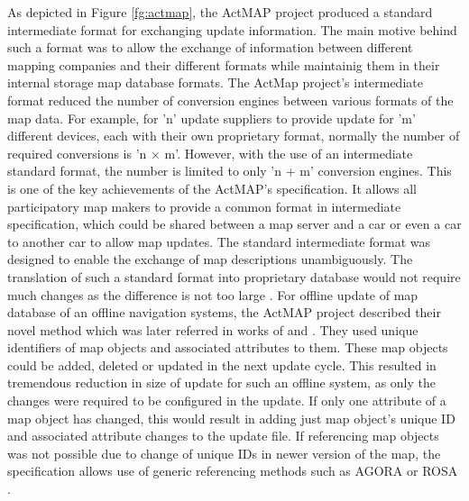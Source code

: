 As depicted in Figure \ref{fg:actmap}, the ActMAP project produced a standard intermediate format for exchanging update information. The main motive behind such a format was to allow the exchange of information between different mapping companies and their different formats while maintainig them in their internal storage map database formats. The ActMap project's intermediate format reduced the number of conversion engines between various formats of the map data. For example, for 'n' update suppliers to provide update for 'm' different devices, each with their own proprietary format, normally the number of required conversions is 'n $\times$ m'. However, with the use of an intermediate standard format, the number is limited to only 'n + m' conversion engines. This is one of the key achievements of the ActMAP's specification. It allows all participatory map makers to provide a common format in intermediate specification, which could be shared between a map server and a car or even a car to another car to allow map updates. The standard intermediate format was designed to enable the exchange of map descriptions unambiguously. The translation of such a standard format into proprietary database would not require much changes as the difference is not too large \cite{flament2003actmap}. For offline update of map database of an offline navigation systems, the ActMAP project described their novel method which was later referred in works of \citet{sakamoto2000proposal} and \citet{asahara2008locally}. They used unique identifiers of map objects and associated attributes to them. These map objects could be added, deleted or updated in the next update cycle. This resulted in tremendous reduction in size of update for such an offline system, as only the changes were required to be configured in the update. If only one attribute of a map object has changed, this would result in adding just map object's unique ID and associated attribute changes to the update file. If referencing map objects was not possible due to change of unique IDs in newer version of the map, the specification allows use of generic referencing methods such as AGORA \cite{hummelsheimlocation} or ROSA \cite{demir2002new}.

